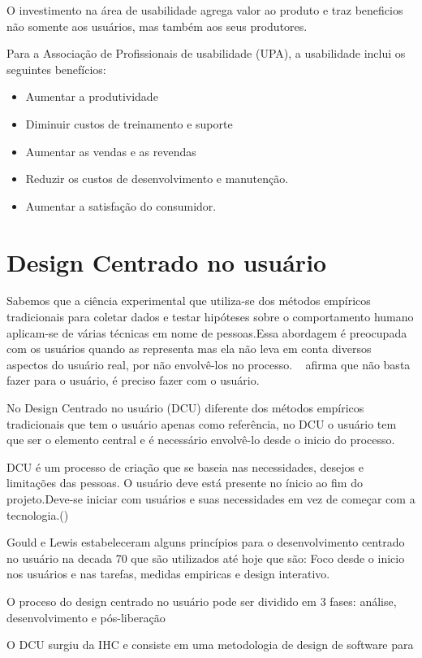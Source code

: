 	O investimento na área de usabilidade agrega valor ao produto e traz beneficios não somente aos usuários, mas também aos seus produtores. 

Para a Associação de Profissionais de usabilidade (UPA), a usabilidade inclui os seguintes benefícios:

\begin{itemize}
\item Aumentar a produtividade
\item Diminuir custos de treinamento e suporte
\item Aumentar as vendas e as revendas
\item Reduzir os custos de desenvolvimento e manutenção.
\item Aumentar a satisfação do consumidor.
\end{itemize}


\section{Design Centrado no usuário}

Sabemos que a ciência experimental que utiliza-se dos métodos empíricos tradicionais para coletar dados e testar hipóteses sobre o comportamento humano aplicam-se de várias técnicas em nome de pessoas.Essa abordagem é preocupada com os usuários quando as representa mas ela não leva em conta diversos aspectos do usuário real, por não envolvê-los no processo. ~\cite{eason1995} afirma que não basta fazer para o usuário, é preciso fazer com o usuário. 

No Design Centrado no usuário (DCU) diferente dos métodos empíricos tradicionais que tem o usuário apenas como  referência, no DCU o usuário tem que ser o elemento central e é necessário envolvê-lo desde o inicio do processo.

DCU é um processo de criação que se baseia nas necessidades, desejos e limitações das pessoas. O usuário deve está presente no ínicio ao fim do projeto.Deve-se iniciar com usuários e suas necessidades em vez de começar com a tecnologia.()

Gould e Lewis estabeleceram alguns princípios para o desenvolvimento centrado no usuário na decada 70 que são utilizados até hoje que são: Foco desde o inicio nos usuários e nas tarefas, medidas empiricas e design interativo.

 O proceso do design centrado no usuário pode ser dividido em 3 fases: análise, desenvolvimento e pós-liberação

O DCU surgiu da IHC e consiste em uma metodologia de design de software para 



